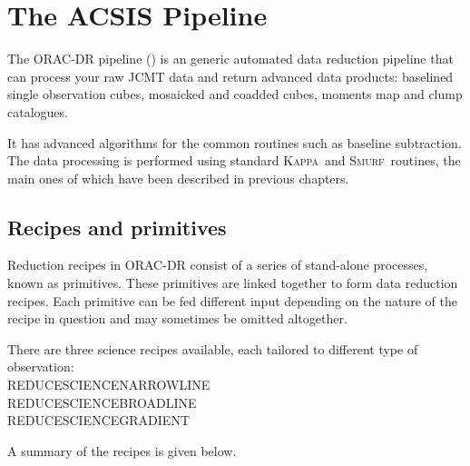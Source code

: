 \documentclass[twoside,11pt]{article}
\newcommand{\xref}[3]{#1}
\newcommand{\xlabel}[1]{}
\renewcommand{\_}{\texttt{\symbol{95}}}
\newcommand{\Kappa}{\xref{\textsc{Kappa}}{sun95}{}}
\newcommand{\smurf}{\xref{\textsc{Smurf}}{sun258}{}}
\begin{document}
\newpage
\section{\xlabel{pipeline}The ACSIS Pipeline}
\label{sec:pipe}
The ORAC-DR pipeline (\cite{oracdr}) is an generic automated data reduction pipeline that can process your raw JCMT data and return advanced data products: baselined single observation cubes, mosaicked and coadded cubes, moments map and clump catalogues.

It has advanced algorithms for the common routines such as baseline subtraction. The data processing is performed using standard \Kappa\ and \smurf\ routines, the main ones of which have been described in previous chapters.

\subsection{\xlabel{recipes}Recipes and primitives}
\label{sec:recipes}
Reduction recipes in ORAC-DR consist of a series of stand-alone processes, known as primitives. These primitives are linked together to form data reduction recipes. Each primitive can be fed different input depending on the nature of the recipe in question and may sometimes be omitted altogether.

 There are three science recipes available, each tailored to different type of observation:\\
REDUCE\_SCIENCE\_NARROWLINE\\
REDUCE\_SCIENCE\_BROADLINE\\
REDUCE\_SCIENCE\_GRADIENT

A summary of the recipes is given below.
\end{document}
